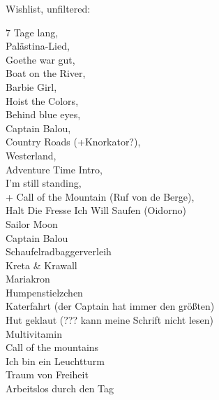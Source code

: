 Wishlist, unfiltered:

7 Tage lang, \\
Palästina-Lied, \\
Goethe war gut, \\
Boat on the River,\\
Barbie Girl,\\
Hoist the Colors,\\
Behind blue eyes,\\
Captain Balou,\\
Country Roads (+Knorkator?),\\
Westerland,\\
Adventure Time Intro,\\
I'm still standing,\\
+ Call of the Mountain (Ruf von de Berge),\\
Halt Die Fresse Ich Will Saufen (Oidorno)\\
Sailor Moon\\
Captain Balou\\
Schaufelradbaggerverleih\\
Kreta \& Krawall\\
Mariakron\\
Humpenstielzchen\\
Katerfahrt (der Captain hat immer den größten) \\
Hut geklaut (??? kann meine Schrift nicht lesen) \\
Multivitamin\\
Call of the mountains \\
Ich bin ein Leuchtturm\\
Traum von Freiheit\\
Arbeitslos durch den Tag\\
